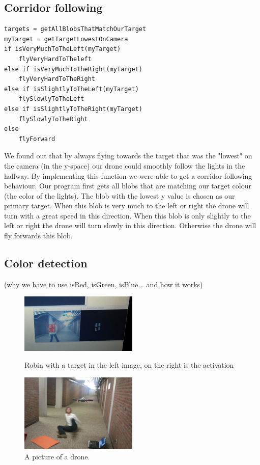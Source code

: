 \documentclass[a4paper,10pt]{article}
\begin{document}
\subsection{Corridor following} 
\label{sec:corridorfollowing}
\begin{verbatim}
targets = getAllBlobsThatMatchOurTarget
myTarget = getTargetLowestOnCamera
if isVeryMuchToTheLeft(myTarget)
    flyVeryHardToTheleft
else if isVeryMuchToTheRight(myTarget)
    flyVeryHardToTheRight
else if isSlightlyToTheLeft(myTarget)
    flySlowlyToTheLeft
else if isSlightlyToTheRight(myTarget)
    flySlowlyToTheRight
else
    flyForward
\end{verbatim}

We found out that by always flying towards the target that was the "lowest" on the camera (in the y-space) our drone could smoothly follow the lights in the hallway. 
By implementing this function we were able to get a corridor-following behaviour. 
Our program first gets all blobs that are matching our target colour (the color of the lights). 
The blob with the lowest y value is chosen as our primary target. 
When this blob is very much to the left or right the drone will turn with a great speed in this direction. 
When this blob is only slightly to the left or right the drone will turn slowly in this direction. 
Otherwise the drone will fly forwards this blob. 
\subsection{Color detection}
(why we have to use isRed, isGreen, isBlue... and how it works)
\begin{figure}[h!]
	\caption{Robin with a target in the left image, on the right is the activation}
	\centering
	\includegraphics[width=0.5\textwidth]{images/robinPresentActivation}
	\label{fig:robinPresentActivation}
\end{figure}

\begin{figure}[h!]
	\caption{A picture of a drone.}
	\centering
	\includegraphics[width=0.5\textwidth]{images/droneAttack}
\end{figure}
\end{document}

